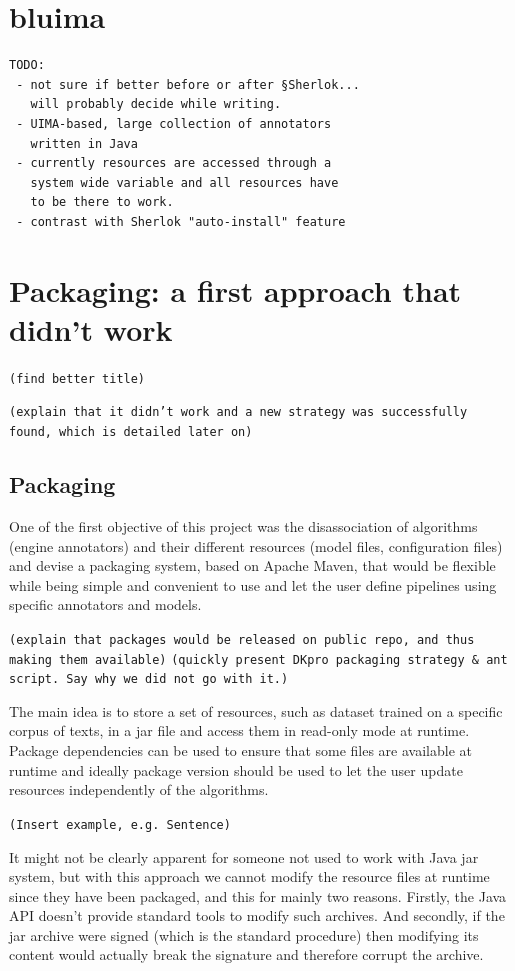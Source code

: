 \documentclass{article}
\newcommand{\TODO}[1]{\texttt{\textcolor{YellowOrange}{(#1)}}} %
\begin{document}
\section{bluima}

\begin{verbatim}
TODO:
 - not sure if better before or after §Sherlok...
   will probably decide while writing.
 - UIMA-based, large collection of annotators
   written in Java
 - currently resources are accessed through a
   system wide variable and all resources have
   to be there to work.
 - contrast with Sherlok "auto-install" feature
\end{verbatim}

\section{Packaging: a first approach that didn't work}

\TODO{find better title}

\TODO{explain that it didn't work and a new strategy was successfully found, which is detailed later on}

\subsection{Packaging}

One of the first objective of this project was the disassociation of algorithms (engine annotators) and their different resources (model files, configuration files) and devise a packaging system, based on Apache Maven, that would be flexible while being simple and convenient to use and let the user define pipelines using specific annotators and models.

\TODO{explain that packages would be released on public repo, and thus making them available}
\TODO{quickly present DKpro packaging strategy & ant script. Say why we did not go with it.}

The main idea is to store a set of resources, such as dataset trained on a specific corpus of texts, in a jar file and access them in read-only mode at runtime. Package dependencies can be used to ensure that some files are available at runtime and ideally package version should be used to let the user update resources independently of the algorithms.

\TODO{Insert example, e.g. Sentence}

It might not be clearly apparent for someone not used to work with Java jar system, but with this approach we cannot modify the resource files at runtime since they have been packaged, and this for mainly two reasons. Firstly, the Java API doesn't provide standard tools to modify such archives. And secondly, if the jar archive were signed (which is the standard procedure) then modifying its content would actually break the signature and therefore corrupt the archive.
\end{document}
